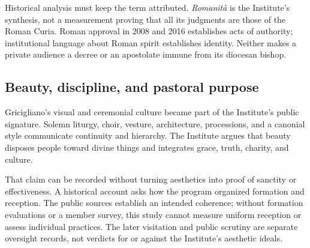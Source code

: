 Historical analysis must keep the term attributed. \emph{Romanità} is the Institute's synthesis, not a measurement proving that all its judgments are those of the Roman Curia. Roman approval in 2008 and 2016 establishes acts of authority; institutional language about Roman spirit establishes identity. Neither makes a private audience a decree or an apostolate immune from its diocesan bishop.

\subsection{Beauty, discipline, and pastoral purpose}

Gricigliano's visual and ceremonial culture became part of the Institute's public signature. Solemn liturgy, choir, vesture, architecture, processions, and a canonial style communicate continuity and hierarchy. The Institute argues that beauty disposes people toward divine things and integrates grace, truth, charity, and culture.

That claim can be recorded without turning aesthetics into proof of sanctity or effectiveness. A historical account asks how the program organized formation and reception. The public sources establish an intended coherence; without formation evaluations or a member survey, this study cannot measure uniform reception or assess individual practices. The later visitation and public scrutiny are separate oversight records, not verdicts for or against the Institute's aesthetic ideals.

